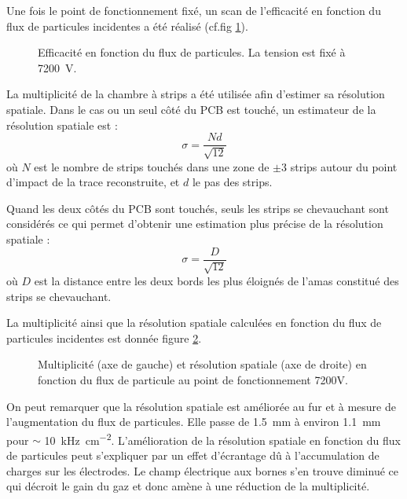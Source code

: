 Une fois le point de fonctionnement fixé, un scan de l'efficacité en fonction du flux de particules incidentes a été réalisé (cf.fig \ref{ScanRatePS}).

\begin{figure}[!ht]
	\centering
	\scalebox{1.4}{}
	\caption{Efficacité en fonction du flux de particules. La tension est fixé à \SI{7200}{\volt}.}
	\label{ScanRatePS}
\end{figure}

La multiplicité de la chambre à strips a été utilisée afin d'estimer sa résolution spatiale. Dans le cas ou un seul côté du PCB est touché, un estimateur de la résolution spatiale est :
\begin{equation}
\sigma=\frac{Nd}{\sqrt{12}}
\end{equation}
où $N$ est le nombre de strips touchés dans une zone de $\pm 3$ strips autour du point d’impact de la trace reconstruite, et $d$ le pas des strips.

Quand les deux côtés du PCB sont touchés, seuls les strips se chevauchant sont considérés ce qui permet d'obtenir une estimation plus précise de la résolution spatiale :
\begin{equation}
\sigma=\frac{D}{\sqrt{12}}
\end{equation} 
où $D$ est la distance entre les deux bords les plus éloignés de l'amas constitué des strips se chevauchant.

La multiplicité ainsi que la résolution spatiale calculées en fonction du flux de particules incidentes est donnée figure \ref{ResoSpatialPS}. 

\begin{figure}[!ht]
	\centering
	\scalebox{1.4}{}
	\caption{Multiplicité (axe de gauche) et résolution spatiale (axe de droite) en fonction du flux de particule au point de fonctionnement 7200V.}
	\label{ResoSpatialPS}
\end{figure}

On peut remarquer que la résolution spatiale est améliorée au fur et à mesure de l'augmentation du flux de particules. Elle passe de \SI{1.5}{\milli\meter} à environ \SI{1.1}{\milli\meter} pour $\sim$ \SI{10}{\kilo\hertz\per\square\centi\meter}. L'amélioration de la résolution spatiale en fonction du flux de particules peut s'expliquer par un effet d'écrantage dû à l'accumulation de charges sur les électrodes. Le champ électrique aux bornes s'en trouve diminué ce qui décroit le gain du gaz et donc amène à une réduction de la multiplicité.

